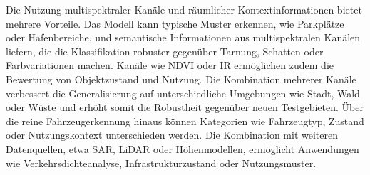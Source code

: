 Die Nutzung multispektraler Kanäle und räumlicher Kontextinformationen bietet mehrere Vorteile. Das Modell kann typische Muster erkennen, wie Parkplätze oder Hafenbereiche, und semantische Informationen aus multispektralen Kanälen liefern, die die Klassifikation robuster gegenüber Tarnung, Schatten oder Farbvariationen machen. Kanäle wie NDVI oder IR ermöglichen zudem die Bewertung von Objektzustand und Nutzung. Die Kombination mehrerer Kanäle verbessert die Generalisierung auf unterschiedliche Umgebungen wie Stadt, Wald oder Wüste und erhöht somit die Robustheit gegenüber neuen Testgebieten. Über die reine Fahrzeugerkennung hinaus können Kategorien wie Fahrzeugtyp, Zustand oder Nutzungskontext unterschieden werden. Die Kombination mit weiteren Datenquellen, etwa SAR, LiDAR oder Höhenmodellen, ermöglicht Anwendungen wie Verkehrsdichteanalyse, Infrastrukturzustand oder Nutzungsmuster.





